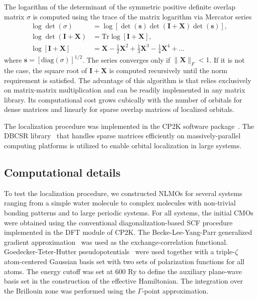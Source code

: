 \documentclass[aps,prl,reprint,amsmath,amssymb]{revtex4-1}
\begin{document}
The logarithm of the determinant of the symmetric positive definite overlap matrix $\sigma$ is computed using the trace of the matrix logarithm via Mercator series
%
\begin{equation} \label{eq:mercator}
\begin{split}
\log \det \left( \sigma \right) &= \log \left[ \det(\mathbf{s}) \det(\mathbf{I} + \mathbf{X}) \det(\mathbf{s}) \right], \\
\log \det \left( \mathbf{I} + \mathbf{X} \right) &= \text{Tr} \log \left[ \mathbf{I} + \mathbf{X} \right], \\
\log \left[ \mathbf{I} + \mathbf{X} \right] &= \mathbf{X} - \frac{1}{2}\mathbf{X}^2  + \frac{1}{3}\mathbf{X}^3 - \frac{1}{4}\mathbf{X}^4 + \ldots
\end{split}
\end{equation}
%
where $\mathbf{s}=\left[\text{diag}(\sigma)\right]^{1/2}$. The series converges only if $\|\mathbf{X}\|_F < 1$. If it is not the case, the square root of $\mathbf{I}+\mathbf{X}$ is computed recursively until the norm requirement is satisfied. The advantage of this algorithm is that relies exclusively on matrix-matrix multiplication and can be readily implemented in any matrix library. Its computational cost grows cubically with the number of orbitals for dense matrices and linearly for sparse overlap matrices of localized orbitals.

The localization procedure was implemented in the CP2K software package~\cite{cp2kgeneral}. The DBCSR library~\cite{borstnik2014sparse} that handles sparse matrices efficiently on massively-parallel computing platforms is utilized to enable orbital localization in large systems.

\subsection{Computational details}

To test the localization procedure, we constructed NLMOs for several systems ranging from a simple water molecule to complex molecules with non-trivial bonding patterns and to large periodic systems. 
%
For all systems, the initial CMOs were obtained using the conventional diagonalization-based SCF procedure implemented in the DFT module of CP2K. 
The Becke-Lee-Yang-Parr generalized gradient approximation~\cite{becke1988density, lee1988development} was used as the exchange-correlation functional.
Goedecker-Teter-Hutter pseudopotentials~\cite{goedecker1996separable} were used together with a triple-$\zeta$ atom-centered Gaussian basis set with two sets of polarization functions for all atoms. 
The energy cutoff was set at 600 Ry to define the auxiliary plane-wave basis set in the construction of the effective Hamiltonian. 
The integration over the Brillouin zone was performed using the $\Gamma$-point approximation.
\end{document}
